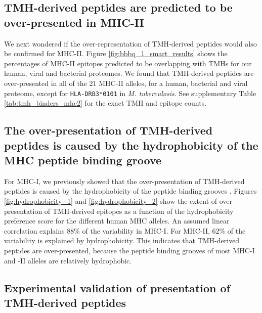\subsection{TMH-derived peptides are predicted to be over-presented in MHC-II}

We next wondered if the over-representation of TMH-derived peptides 
would also be confirmed for MHC-II. 
Figure \ref{fig:bbbq_1_smart_results} shows the percentages of MHC-II epitopes 
predicted to be overlapping with TMHs for our human, viral and bacterial proteomes.
We found that TMH-derived peptides are over-presented in all
of the 21 MHC-II alleles, 
for a human, bacterial and viral proteome,
except for \verb;HLA-DRB3*0101; in \emph{M. tuberculosis}.
See supplementary Table \ref{tab:tmh_binders_mhc2} 
for the exact TMH and epitope counts.

\subsection{The over-presentation of TMH-derived peptides is caused by the hydrophobicity of the MHC peptide binding groove}

For MHC-I, we previously showed that the over-presentation of TMH-derived 
peptides is caused by the hydrophobicity of the peptide binding 
grooves \cite{bianchi2017}. 
Figures \ref{fig:hydrophobicity_1} and \ref{fig:hydrophobicity_2}
show the extent of over-presentation
of TMH-derived epitopes as a function of the hydrophobicity preference score 
for the different human MHC alleles.
An assumed linear correlation explains 88\% of the variability in MHC-I.
For MHC-II, 62\% of the variability is explained by hydrophobicity. 
This indicates that TMH-derived peptides are over-presented, 
because the peptide binding grooves of most MHC-I and -II alleles 
are relatively hydrophobic.

\subsection{Experimental validation of presentation of TMH-derived peptides}

